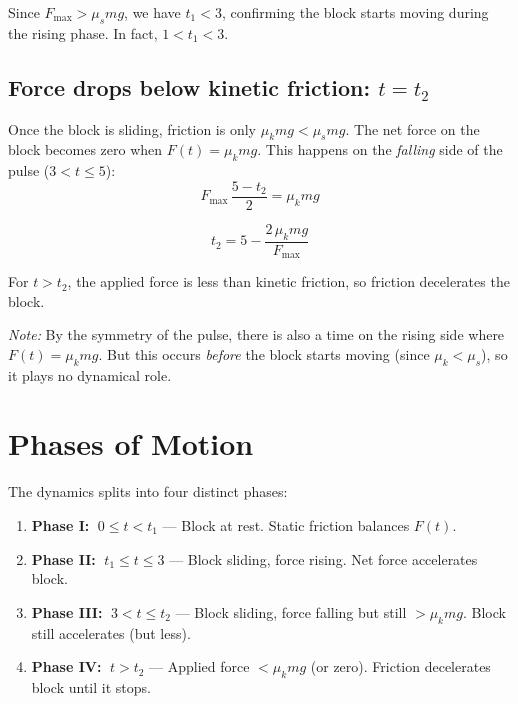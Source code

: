 \documentclass[11pt]{article}
\begin{document}
\noindent
Since $F_{\max} > \mu_s m g$, we have $t_1 < 3$, confirming the block starts moving during the rising phase.  In fact, $1 < t_1 < 3$.

\subsection{Force drops below kinetic friction: $t = t_2$}

Once the block is sliding, friction is only $\mu_k m g < \mu_s m g$.  The net force on the block becomes zero when $F(t) = \mu_k m g$.  This happens on the \emph{falling} side of the pulse ($3 < t \le 5$):
\begin{equation}
F_{\max}\,\frac{5 - t_2}{2} = \mu_k m g
\end{equation}

\begin{equation}
\boxed{t_2 = 5 - \frac{2\,\mu_k m g}{F_{\max}}}
\label{eq:t2}
\end{equation}

\noindent
For $t > t_2$, the applied force is less than kinetic friction, so friction decelerates the block.

\medskip
\noindent
\textit{Note:} By the symmetry of the pulse, there is also a time on the rising side where $F(t) = \mu_k m g$.  But this occurs \emph{before} the block starts moving (since $\mu_k < \mu_s$), so it plays no dynamical role.

\section{Phases of Motion}

The dynamics splits into four distinct phases:

\begin{tcolorbox}[colback=green!5, colframe=green!50!black, title=Phase Summary]
\begin{enumerate}
    \item \textbf{Phase I:} $\;0 \le t < t_1$ --- Block at rest.  Static friction balances $F(t)$.
    \item \textbf{Phase II:} $\;t_1 \le t \le 3$ --- Block sliding, force rising.  Net force accelerates block.
    \item \textbf{Phase III:} $\;3 < t \le t_2$ --- Block sliding, force falling but still $> \mu_k mg$.  Block still accelerates (but less).
    \item \textbf{Phase IV:} $\;t > t_2$ --- Applied force $< \mu_k mg$ (or zero).  Friction decelerates block until it stops.
\end{enumerate}
\end{tcolorbox}
\end{document}

